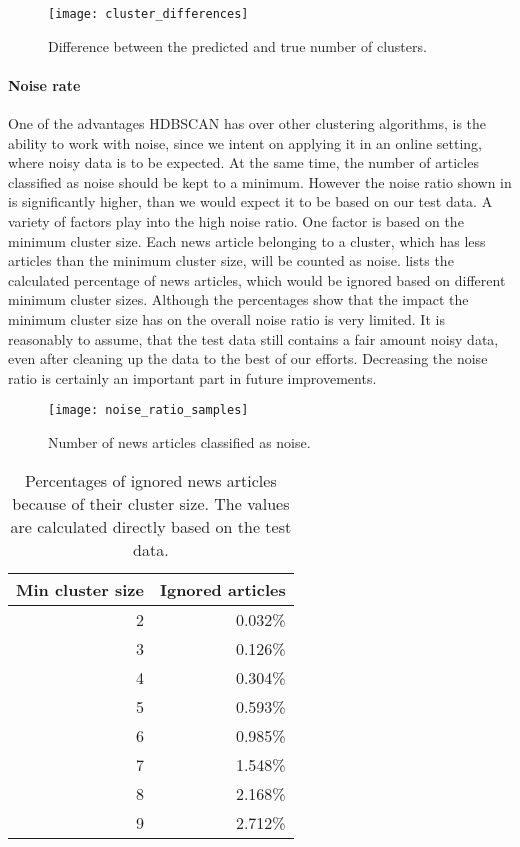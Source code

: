 \begin{figure}[h]
    \centering
    \texttt{[image: cluster\_differences]}
    \caption{Difference between the predicted and true number of clusters.}
    \label{fig:cluster_differences}
\end{figure}

\paragraph{Noise rate}
One of the advantages HDBSCAN has over other clustering algorithms,
is the ability to work with noise, since we intent on applying it in an online setting,
where noisy data is to be expected.
At the same time, the number of articles classified as noise should be kept to a minimum.
However the noise ratio shown in  is significantly higher,
than we would expect it to be based on our test data.
A variety of factors play into the high noise ratio.
One factor is based on the minimum cluster size.
Each news article belonging to a cluster,
which has less articles than the minimum cluster size, will be counted as noise.
 lists the calculated percentage of news articles,
which would be ignored based on different minimum cluster sizes.
Although the percentages show that the impact the minimum cluster size has on the overall noise ratio is very limited.
It is reasonably to assume, that the test data still contains a fair amount noisy data,
even after cleaning up the data to the best of our efforts.
Decreasing the noise ratio is certainly an important part in future improvements.

\begin{figure}[h]
    \centering
    \texttt{[image: noise\_ratio\_samples]}
    \caption{Number of news articles classified as noise.}
    \label{fig:noise_ratio_samples}
\end{figure}

\begin{table}[h]
    \centering
    \begin{tabular}{|r|r|}
        \hline
        \textbf{Min cluster size} & \textbf{Ignored articles} \\
        \hline
        2 & 0.032\% \\ \hline
        3 & 0.126\% \\ \hline
        4 & 0.304\% \\ \hline
        5 & 0.593\% \\ \hline
        6 & 0.985\% \\ \hline
        7 & 1.548\% \\ \hline
        8 & 2.168\% \\ \hline
        9 & 2.712\% \\ \hline
    \end{tabular}
    \caption{
        Percentages of ignored news articles because of their cluster size.
        The values are calculated directly based on the test data.
    }
    \label{tab:expected_noise}
\end{table}

